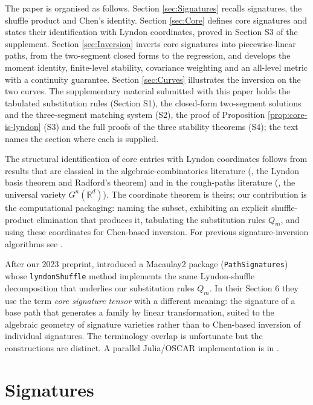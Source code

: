 \documentclass[11pt,english]{article}
\theoremstyle{definition}
\theoremstyle{remark}
\begin{document}
The paper is organised as follows. Section \ref{sec:Signatures} recalls
signatures, the shuffle product and Chen's identity. Section
\ref{sec:Core} defines core signatures and states their identification
with Lyndon coordinates, proved in Section S3 of the supplement. Section
\ref{sec:Inversion} inverts core signatures into piecewise-linear
paths, from the two-segment closed forms to the regression, and
develops the moment identity, finite-level stability, covariance weighting
and an all-level metric with a continuity guarantee. Section \ref{sec:Curves}
illustrates the inversion on the two curves. The supplementary
material submitted with this paper holds the tabulated substitution
rules (Section S1), the closed-form two-segment solutions and the
three-segment matching system (S2), the proof of Proposition
\ref{prop:core-is-lyndon} (S3) and the full proofs of the three
stability theorems (S4); the text names the section where each is
supplied.

The structural identification of core entries with Lyndon coordinates
follows from results that are classical in the algebraic-combinatorics
literature (\cite{Reutenauer}, the Lyndon basis theorem and Radford's
theorem) and in the rough-paths literature (\cite{varieties}, the
universal variety $G^{n}(\mathbb{R}^{d})$). The coordinate theorem is
theirs; our contribution is the computational packaging: naming the
subset, exhibiting an explicit shuffle-product elimination that
produces it, tabulating the substitution rules $Q_{m}$, and using these
coordinates for Chen-based inversion. For previous signature-inversion
algorithms see \cite{inversion}.

After our 2023 preprint, \cite{macaulay2} introduced a Macaulay2 package
(\texttt{PathSignatures}) whose \texttt{lyndonShuffle} method implements
the same Lyndon-shuffle decomposition that underlies our substitution
rules $Q_{m}$. In their Section 6 they use the term \emph{core signature
tensor} with a different meaning: the signature of a base path that
generates a family by linear transformation, suited to the algebraic
geometry of signature varieties rather than to Chen-based inversion
of individual signatures. The terminology overlap is unfortunate but
the constructions are distinct. A parallel Julia/OSCAR implementation
is in \cite{signaturetensorsjl}.

\section{Signatures\label{sec:Signatures}}
\end{document}
